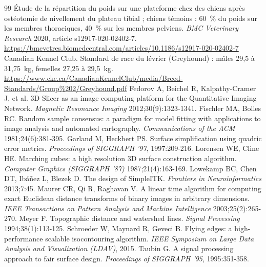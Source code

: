 \documentclass[11pt,a4paper]{article}
\begin{document}
\begin{thebibliography}{99}
 Étude de la répartition du poids sur une plateforme chez des chiens après ostéotomie de
nivellement du plateau tibial ; chiens témoins : 60~\% du poids sur les membres thoraciques, 40~\% sur les membres
pelviens. \emph{BMC Veterinary Research} 2020, article s12917-020-02402-7.
\url{https://bmcvetres.biomedcentral.com/articles/10.1186/s12917-020-02402-7}
 Canadian Kennel Club. Standard de race du lévrier (Greyhound) : mâles 29,5 à 31,75~kg, femelles 27,25 à
29,5~kg. \url{https://www.ckc.ca/CanadianKennelClub/media/Breed-Standards/Group%202/Greyhound.pdf}
 Fedorov A, Beichel R, Kalpathy-Cramer J, et al. 3D Slicer as an image computing platform for
the Quantitative Imaging Network. \emph{Magnetic Resonance Imaging} 2012;30(9):1323-1341.
 Fischler MA, Bolles RC. Random sample consensus: a paradigm for model fitting with applications
to image analysis and automated cartography. \emph{Communications of the ACM} 1981;24(6):381-395.
 Garland M, Heckbert PS. Surface simplification using quadric error metrics. \emph{Proceedings
of SIGGRAPH '97}, 1997:209-216.
 Lorensen WE, Cline HE. Marching cubes: a high resolution 3D surface construction algorithm.
\emph{Computer Graphics (SIGGRAPH '87)} 1987;21(4):163-169.
 Lowekamp BC, Chen DT, Ibáñez L, Blezek D. The design of SimpleITK. \emph{Frontiers in
Neuroinformatics} 2013;7:45.
 Maurer CR, Qi R, Raghavan V. A linear time algorithm for computing exact Euclidean distance
transforms of binary images in arbitrary dimensions. \emph{IEEE Transactions on Pattern Analysis and Machine
Intelligence} 2003;25(2):265-270.
 Meyer F. Topographic distance and watershed lines. \emph{Signal Processing} 1994;38(1):113-125.
 Schroeder W, Maynard R, Geveci B. Flying edges: a high-performance scalable isocontouring
algorithm. \emph{IEEE Symposium on Large Data Analysis and Visualization (LDAV)}, 2015.
 Taubin G. A signal processing approach to fair surface design. \emph{Proceedings of SIGGRAPH
'95}, 1995:351-358.
\end{thebibliography}
\end{document}
